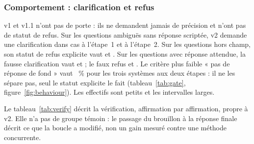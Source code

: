 





\subsubsection{Comportement : clarification et refus}
v1 et v1.1 n'ont pas de porte : ils ne demandent jamais de précision et n'ont pas de statut de refus. Sur les questions ambiguës
sans réponse scriptée, v2 demande une clarification dans \EvSoneVtwoClarAskedCount{} cas à l'étape~1 et \EvStwoVtwoClarAskedCount{}
à l'étape~2. Sur les questions hors champ, son statut de refus explicite vaut \EvSoneVtwoRefExplicitCount{} et
\EvStwoVtwoRefExplicitCount. Sur les questions avec réponse attendue, la fausse clarification vaut \EvSoneVtwoFalseClarifyCount{}
et \EvStwoVtwoFalseClarifyCount ; le faux refus \EvSoneVtwoFalseRefuseCount{} et \EvStwoVtwoFalseRefuseCount. Le critère plus faible
« pas de réponse de fond » vaut \EvSoneVoneRefNoSubst~\% pour les trois systèmes aux deux étapes : il ne les sépare pas, seul le
statut explicite le fait (tableau~\ref{tab:gate}, figure~\ref{fig:behaviour}). Les effectifs sont petits et les intervalles larges.

Le tableau~\ref{tab:verify} décrit la vérification, affirmation par affirmation, propre à v2. Elle n'a pas de groupe témoin :
le passage du brouillon à la réponse finale décrit ce que la boucle a modifié, non un gain mesuré contre une méthode concurrente.





